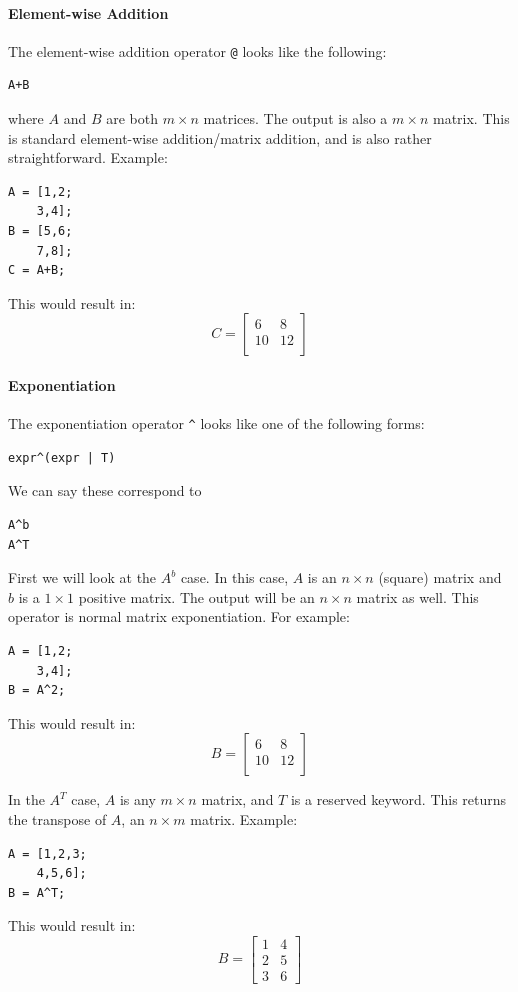 \paragraph{Element-wise Addition}
The element-wise addition operator \verb=@= looks like the following:
\begin{lstlisting}
A+B
\end{lstlisting}
where $A$ and $B$ are both $m\times n$ matrices.  The output is also a $m \times n$ matrix. This is standard element-wise addition/matrix addition, and is also rather straightforward.  Example:
\begin{lstlisting}
A = [1,2;
    3,4];
B = [5,6;
    7,8];
C = A+B;
\end{lstlisting}
This would result in:
$$C=\begin{bmatrix}
6&8\\
10&12\\
\end{bmatrix}$$

\cprotect\paragraph{Exponentiation}
The exponentiation operator \verb=^= looks like one of the following forms:
\begin{lstlisting}
expr^(expr | T)
\end{lstlisting}
We can say these correspond to
\begin{lstlisting}
A^b
A^T
\end{lstlisting}
First we will look at the $A^b$ case.  In this case, $A$ is an $n\times n$ (square) matrix and $b$ is a $1\times 1$ positive matrix.  The output will be an $n\times n$ matrix as well.  This operator is normal matrix exponentiation.  For example:
\begin{lstlisting}
A = [1,2;
    3,4];
B = A^2;
\end{lstlisting}
This would result in:
$$B=\begin{bmatrix}
6&8\\
10&12\\
\end{bmatrix}$$

In the $A^T$ case, $A$ is any $m\times n$ matrix, and $T$ is a reserved keyword.  This returns the transpose of $A$, an $n \times m$ matrix.  Example:
\begin{lstlisting}
A = [1,2,3;
    4,5,6];
B = A^T;
\end{lstlisting}
This would result in:
$$B=\begin{bmatrix}
1&4\\
2&5\\
3&6
\end{bmatrix}$$

